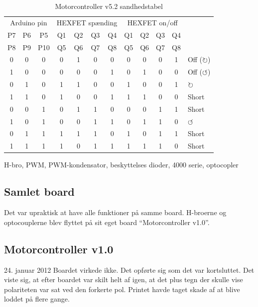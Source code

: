 \documentclass[a4paper,oneside,article,danish,table]{memoir}
\newcommand{\boarddate}[1]{\textcolor{blue!80!black}{#1}}
\begin{document}
\begin{table}[htbp]
  \caption{Motorcontroller v5.2 sandhedstabel}
  \centering
  \begin{tabular}{ccc|cccc|ccccl}
    \toprule
    \multicolumn{3}{c}{Arduino pin}&\multicolumn{4}{c}{HEXFET spænding}&\multicolumn{4}{c}{HEXFET on/off}\\
    P7&P6&P5 &Q1&Q2&Q3&Q4 &Q1&Q2&Q3&Q4\\
    P8&P9&P10 &Q5&Q6&Q7&Q8 &Q5&Q6&Q7&Q8\\
    \midrule
    0&0&0 &0&1&0&0 &0&0&0&1 & Off ($\circlearrowright$)\\
    1&0&0 &0&0&0&1 &0&1&0&0 & Off ($\circlearrowleft$)\\
    0&1&0 &1&1&0&0 &1&0&0&1 & $\circlearrowright$\\
    1&1&0 &1&0&0&1 &1&1&0&0 & Short\\
    0&0&1 &0&1&1&0 &0&0&1&1 & Short\\
    1&0&1 &0&0&1&1 &0&1&1&0 & $\circlearrowleft$\\
    0&1&1 &1&1&1&0 &1&0&1&1 & Short\\
    1&1&1 &1&0&1&1 &1&1&1&0 & Short\\
    \bottomrule
  \end{tabular}
  \label{tab:sandhed}
\end{table}

H-bro, PWM, PWM-kondensator, beskyttelses dioder, 4000 serie, optocopler

\subsection{Samlet board}
Det var upraktisk at have alle funktioner på samme board. H-broerne og optocouplerne blev flyttet på sit eget board “Motorcontroller v1.0”.

\subsection{Motorcontroller v1.0}
\boarddate{24. januar 2012}
Boardet virkede ikke. Det opførte sig som det var kortsluttet. Det viste sig, at efter boardet var skilt helt af igen, at det plus tegn der skulle vise polariteten var sat ved den forkerte pol. Printet havde taget skade af at blive loddet på flere gange.
\end{document}
